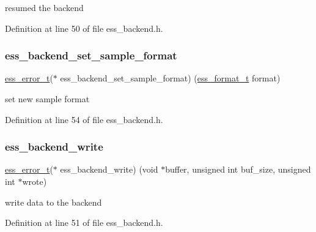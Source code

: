resumed the backend 

Definition at line 50 of file ess\+\_\+backend.\+h.

\mbox{\label{structess__backend_ab081e20cac5828678d80e03f5182a155}} 
\subsubsection{\texorpdfstring{ess\+\_\+backend\+\_\+set\+\_\+sample\+\_\+format}{ess\_backend\_set\_sample\_format}}
{\footnotesize\ttfamily \hyperlink{ess__error_8h_a08ab97fcf6745dee67de912e41bd3236}{ess\+\_\+error\+\_\+t}($\ast$  ess\+\_\+backend\+\_\+set\+\_\+sample\+\_\+format) (\hyperlink{ess__format_8h_a9aa23f58a25b9e8360c1400e0cadfd80}{ess\+\_\+format\+\_\+t} format)}

set new sample format 

Definition at line 54 of file ess\+\_\+backend.\+h.

\mbox{\label{structess__backend_a952c8ea376b49dfe0af1c1ef030c159d}} 
\subsubsection{\texorpdfstring{ess\+\_\+backend\+\_\+write}{ess\_backend\_write}}
{\footnotesize\ttfamily \hyperlink{ess__error_8h_a08ab97fcf6745dee67de912e41bd3236}{ess\+\_\+error\+\_\+t}($\ast$  ess\+\_\+backend\+\_\+write) (void $\ast$buffer, unsigned int buf\+\_\+size, unsigned int $\ast$wrote)}

write data to the backend 

Definition at line 51 of file ess\+\_\+backend.\+h.

\mbox{\label{structess__backend_a9f29adb0a4cfb608557d26692fa78254}} 
